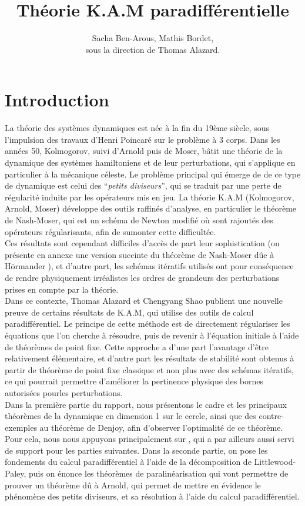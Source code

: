 \documentclass[11pt,a4paper]{article}
\title{\textbf{Théorie K.A.M paradifférentielle}}
\date{}
\author{Sacha Ben-Arous, Mathis Bordet, \\ sous la direction de Thomas Alazard.}
\begin{document}
\maketitle
\tableofcontents
\newpage

\section{Introduction}
La théorie des systèmes dynamiques est née à la fin du 19ème siècle, sous l'impulsion des travaux d'Henri Poincaré sur le problème à 3 corps. Dans les années 50, Kolmogorov, suivi d'Arnold puis de Moser, bâtit une théorie de la dynamique des systèmes hamiltoniens et de leur perturbations, qui s'applique en particulier à la mécanique céleste. Le problème principal qui émerge de de ce type de dynamique est celui des ``\textit{petits diviseurs}'', qui se traduit par une perte de régularité induite par les opérateurs mis en jeu. La théorie K.A.M (Kolmogorov, Arnold, Moser) développe des outils raffinés d'analyse, en particulier le théorème de Nash-Moser, qui est un schéma de Newton modifié où sont rajoutés des opérateurs régularisants, afin de sumonter cette difficultée. \\
Ces résultats sont cependant difficiles d'accès de part leur sophistication (on présente en annexe une version succinte du théorème de Nash-Moser dûe à Hörmander \cite{hormander}), et d'autre part, les schémas itératifs utilisés ont pour conséquence de rendre physiquement irréalistes les ordres de grandeurs des perturbations prises en compte par la théorie. \\
Dans ce contexte, Thomas Alazard et Chengyang Shao publient une nouvelle preuve \cite{alazard} de certains résultats de K.A.M, qui utilise des outils de calcul paradifférentiel. Le principe de cette méthode est de directement régulariser les équations que l'on cherche à résoudre, puis de revenir à l'équation initiale à l'aide de théorèmes de point fixe. Cette approche a d'une part l'avantage d'être relativement élémentaire, et d'autre part les résultats de stabilité sont obtenus à partir de théorème de point fixe classique et non plus avec des schémas itératifs, ce qui pourrait permettre d'améliorer la pertinence physique des bornes autorisées pourles perturbations. \\

Dans la première partie du rapport, nous présentons le cadre et les principaux théorèmes de la dynamique en dimension 1 sur le cercle, ainsi que des contre-exemples au théorème de Denjoy, afin d'observer l'optimalité de ce théorème. Pour cela, nous nous appuyons principalement sur \cite{dgv}, qui a par ailleurs aussi servi de support pour les parties suivantes. Dans la seconde partie, on pose les fondements du calcul paradifférentiel à l'aide de la décomposition de Littlewood-Paley, puis on énonce les théorèmes de paralinéarisation qui vont permettre de prouver un théorème dû à Arnold, qui permet de mettre en évidence le phénomène des petits diviseurs, et sa résolution à l'aide du calcul paradifférentiel.
\end{document}
